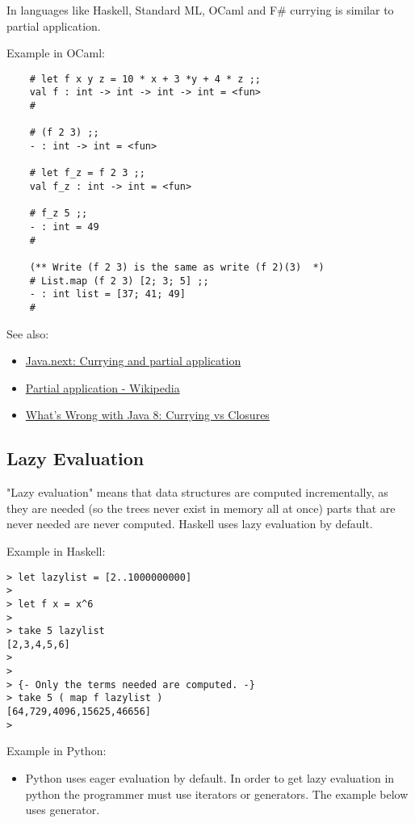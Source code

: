 \documentclass[11pt]{article}
\begin{document}
In languages like Haskell, Standard ML, OCaml and F\# currying is
similar to partial application.

Example in OCaml:

\begin{verbatim}
    # let f x y z = 10 * x + 3 *y + 4 * z ;;
    val f : int -> int -> int -> int = <fun>
    # 

    # (f 2 3) ;;
    - : int -> int = <fun>
    
    # let f_z = f 2 3 ;;
    val f_z : int -> int = <fun>

    # f_z 5 ;;
    - : int = 49
    #    
    
    (** Write (f 2 3) is the same as write (f 2)(3)  *)
    # List.map (f 2 3) [2; 3; 5] ;;
    - : int list = [37; 41; 49]
    #
\end{verbatim}

See also:

\begin{itemize}
\item \href{http://www.ibm.com/developerworks/library/j-jn9/}{Java.next: Currying and partial application}
\item \href{https://en.wikipedia.org/wiki/Partial_application}{Partial application - Wikipedia}
\item \href{https://dzone.com/articles/whats-wrong-java-8-currying-vs}{What's Wrong with Java 8: Currying vs Closures}
\end{itemize}

\subsection{Lazy Evaluation}
\label{sec-1-7}

"Lazy evaluation" means that data structures are computed
incrementally, as they are needed (so the trees never exist in memory
all at once) parts that are never needed are never computed. Haskell
uses lazy evaluation by default.

Example in Haskell: 

\begin{verbatim}
> let lazylist = [2..1000000000]
> 
> let f x = x^6 
> 
> take 5 lazylist 
[2,3,4,5,6]
>
>
> {- Only the terms needed are computed. -}
> take 5 ( map f lazylist )
[64,729,4096,15625,46656]
>
\end{verbatim}

Example in Python:

\begin{itemize}
\item Python uses eager evaluation by default. In order to get lazy evaluation in python the programmer must use iterators or generators. The example below uses generator.
\end{itemize}
\end{document}
